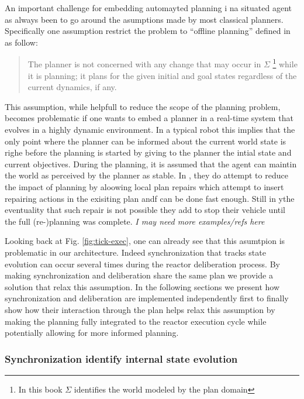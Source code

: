 An important challenge for embedding automayted planning i na situated
agent as always been to go around the asumptions made by most classical
planners. Specifically one assumption restrict the problem to ``offline
planning''  defined in \cite{ghallab04} as follow:
\begin{quotation}
  The planner is not concerned with any change that may occur in
  $\Sigma$ \footnote{In this book $\Sigma$ identifies the world modeled
    by the plan domain} while it is planning; it plans for the given
  initial and goal states regardless of the current dynamics, if any.
\end{quotation}
This assumption, while helpfull to reduce the scope of the planning
problem, becomes problematic if one wants to embed a planner in a
real-time system that evolves in a highly dynamic environment. In a
typical robot this implies that the only point where the planner can
be informed about the current world state is righe before the planning
is started by giving to the planner the intial state and current
objectives. During the planning, it is assumed that the agent can
maintin the world as perceived by the planner as stable. In 
\cite{lemai04, lemai-chenevier2004}, they do attempt to reduce the
impact of planning by aloowing local plan repairs which attempt to
insert repairing actions in the exisiting plan andf can be done fast
enough. Still in ythe eventuality that such repair is not possible
they add to stop their vehicle until the full (re-)planning was
complete. {\em I may need more examples/refs here}

Looking back at Fig. \ref{fig:tick-exec}, one can already see that
this asumtpion is problematic in our architecture. Indeed
synchronization that tracks state evolution can occur several times 
during the reactor deliberation process. By making synchronization and
deliberation share the same plan we provide a solution that relax this
assumption. In the following sections we present how synchronization
and deliberation are implemented independently first to finally show
how their interaction through the plan helps relax this assumption by
making the planning fully integrated to the reactor execution cycle
while potentially allowing for more informed planning. 


\subsubsection{Synchronization identify internal state evolution}
\label{sec:arch:synch}


